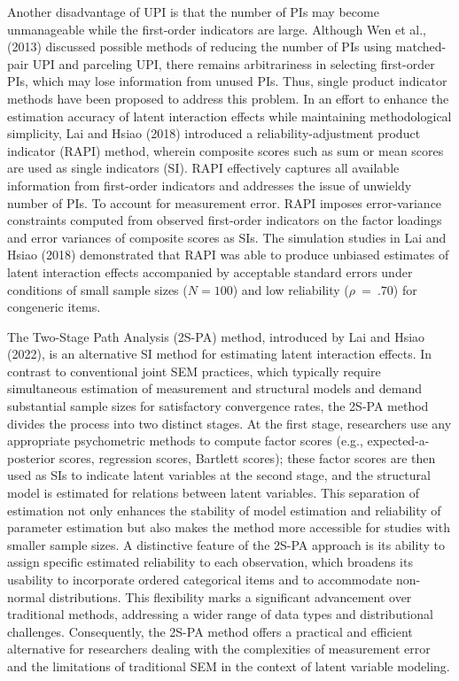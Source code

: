 \documentclass[
  man]{apa7}
\begin{document}
Another disadvantage of UPI is that the number of PIs may become unmanageable while the first-order indicators are large. Although Wen et al., (2013) discussed possible methods of reducing the number of PIs using matched-pair UPI and parceling UPI, there remains arbitrariness in selecting first-order PIs, which may lose information from unused PIs. Thus, single product indicator methods have been proposed to address this problem. In an effort to enhance the estimation accuracy of latent interaction effects while maintaining methodological simplicity, Lai and Hsiao (2018) introduced a reliability-adjustment product indicator (RAPI) method, wherein composite scores such as sum or mean scores are used as single indicators (SI). RAPI effectively captures all available information from first-order indicators and addresses the issue of unwieldy number of PIs. To account for measurement error. RAPI imposes error-variance constraints computed from observed first-order indicators on the factor loadings and error variances of composite scores as SIs. The simulation studies in Lai and Hsiao (2018) demonstrated that RAPI was able to produce unbiased estimates of latent interaction effects accompanied by acceptable standard errors under conditions of small sample sizes (\(N = 100\)) and low reliability (\(\rho \ = \ .70\)) for congeneric items.

The Two-Stage Path Analysis (2S-PA) method, introduced by Lai and Hsiao (2022), is an alternative SI method for estimating latent interaction effects. In contrast to conventional joint SEM practices, which typically require simultaneous estimation of measurement and structural models and demand substantial sample sizes for satisfactory convergence rates, the 2S-PA method divides the process into two distinct stages. At the first stage, researchers use any appropriate psychometric methods to compute factor scores (e.g., expected-a-posterior scores, regression scores, Bartlett scores); these factor scores are then used as SIs to indicate latent variables at the second stage, and the structural model is estimated for relations between latent variables. This separation of estimation not only enhances the stability of model estimation and reliability of parameter estimation but also makes the method more accessible for studies with smaller sample sizes. A distinctive feature of the 2S-PA approach is its ability to assign specific estimated reliability to each observation, which broadens its usability to incorporate ordered categorical items and to accommodate non-normal distributions. This flexibility marks a significant advancement over traditional methods, addressing a wider range of data types and distributional challenges. Consequently, the 2S-PA method offers a practical and efficient alternative for researchers dealing with the complexities of measurement error and the limitations of traditional SEM in the context of latent variable modeling.
\end{document}
